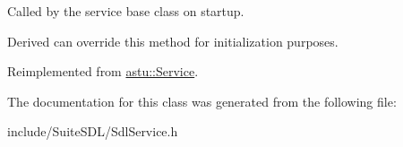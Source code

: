 Called by the service base class on startup.

Derived can override this method for initialization purposes. 

Reimplemented from \hyperlink{classastu_1_1Service_a357dc663e000b1f086f681ec3c459bfe}{astu\+::\+Service}.



The documentation for this class was generated from the following file\+:\begin{DoxyCompactItemize}
\item 
include/\+Suite\+S\+D\+L/Sdl\+Service.\+h\end{DoxyCompactItemize}
